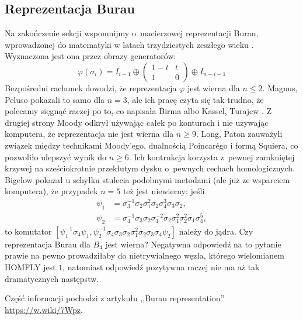 
\subsection{Reprezentacja Burau}
Na zakończenie sekcji wspomnijmy o~macierzowej reprezentacji Burau, wprowadzonej do matematyki w latach trzydziestych zeszłego wieku \cite{burau33}.
%
%
Wyznaczona jest ona przez obrazy generatorów:
\begin{equation}
    \varphi(\sigma_i) = I_{i-1} \oplus \begin{pmatrix}
        1-t & t \\
        1   & 0
    \end{pmatrix} \oplus I_{n-i-1}
\end{equation}
Bezpośredni rachunek dowodzi, że reprezentacja $\varphi$ jest wierna dla $n \le 2$.
Magnus, Peluso \cite{peluso69} pokazali to samo dla $n = 3$, ale ich pracę czyta się tak trudno, że polecamy sięgnąć raczej po to, co napisała Birma \cite[s. 129]{birman74} albo Kassel, Turajew \cite[s. 110]{kassel08}.
Z drugiej strony Moody \cite{moody91} odkrył używając całek po konturach i nie używając komputera, że reprezentacja nie jest wierna dla $n \ge 9$.
%
Long, Paton \cite{paton93} zauważyli związek między technikami Moody'ego, dualnością Poincarégo i formą Squiera, co pozwoliło ulepszyć wynik do $n \ge 6$.
%
%
Ich kontrukcja korzysta z~pewnej zamkniętej krzywej na sześciokrotnie przekłutym dysku o~pewnych cechach homologicznych.
Bigelow \cite{bigelow99} pokazał u schyłku stulecia podobnymi metodami (ale już ze wsparciem komputera), że przypadek $n = 5$ też jest niewierny: jeśli
%
\begin{align}
    \psi_1 & = \sigma_3^{{-1}}\sigma_2\sigma_1^2\sigma_2\sigma_4^3\sigma_3\sigma_2, \\
\psi_2 & = \sigma_4^{{-1}}\sigma_3\sigma_2\sigma_1^{{-2}}\sigma_2\sigma_1^2\sigma_2^2\sigma_1\sigma_4^5,
\end{align}
to komutator $[\psi_1^{{-1}}\sigma_4\psi_1,\psi_2^{{-1}}\sigma_4\sigma_3\sigma_2\sigma_1^2\sigma_2\sigma_3\sigma_4\psi_2]$ należy do jądra.
Czy reprezentacja Burau dla $B_4$ jest wierna?
Negatywna odpowiedź na to pytanie prawie na pewno prowadziłaby do
nietrywialnego węzła, którego wielomianem HOMFLY jest $1$,
natomiast odpowiedź pozytywna raczej nie ma aż tak dramatycznych następstw.

Część informacji pochodzi z artykułu ,,Burau representation'' \url{https://w.wiki/7Wpz}.
